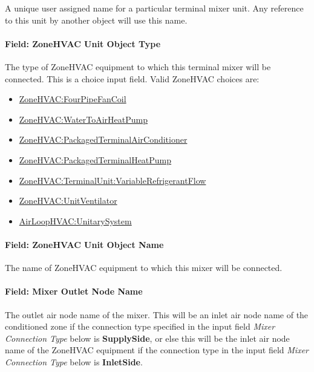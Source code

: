 A unique user assigned name for a particular terminal mixer unit. Any reference to this unit by another object will use this name.

\paragraph{Field: ZoneHVAC Unit Object Type}\label{field-zonehvac-unit-object-type}

The type of ZoneHVAC equipment to which this terminal mixer will be connected. This is a choice input field.
Valid ZoneHVAC choices are:
\begin{itemize}
\setlength{\parskip}{0pt}
\setlength{\itemsep}{0pt plus 1pt}
\item \hyperref[zonehvacfourpipefancoil]{ZoneHVAC:FourPipeFanCoil}
\item \hyperref[zonehvacwatertoairheatpump]{ZoneHVAC:WaterToAirHeatPump}
\item \hyperref[zonehvacpackagedterminalairconditioner]{ZoneHVAC:PackagedTerminalAirConditioner}
\item \hyperref[zonehvacpackagedterminalheatpump]{ZoneHVAC:PackagedTerminalHeatPump}
\item \hyperref[zonehvacterminalunitvariablerefrigerantflow]{ZoneHVAC:TerminalUnit:VariableRefrigerantFlow}
\item \hyperref[zonehvacunitventilator]{ZoneHVAC:UnitVentilator}
\item \hyperref[airloophvacunitarysystem]{AirLoopHVAC:UnitarySystem}
\end{itemize}

\paragraph{Field: ZoneHVAC Unit Object Name}\label{field-zonehvac-unit-object-name}

The name of ZoneHVAC equipment to which this mixer will be connected.

\paragraph{Field: Mixer Outlet Node Name}\label{field-mixer-outlet-node-name}

The outlet air node name of the mixer. This will be an inlet air node name of the conditioned zone if the connection type specified in the input field \textit{Mixer Connection Type} below is \textbf{SupplySide}, or else this will be the inlet air node name of the ZoneHVAC equipment if the connection type in the input field \textit{Mixer Connection Type} below is \textbf{InletSide}.

